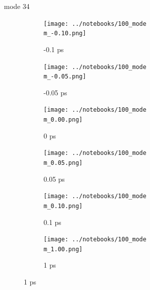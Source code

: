 \documentclass{beamer}
\begin{document}
\renewcommand\m{34}
\begin{frame}{mode \m}
	\begin{figure}
		\centering
		\begin{subfigure}[b]{\w\textwidth}
			\centering
			\texttt{[image: ../notebooks/100\_mode\\m\_-0.10.png]}
			\caption{-0.1 ps}
		\end{subfigure}
		\begin{subfigure}[b]{\w\textwidth}
			\centering
			\texttt{[image: ../notebooks/100\_mode\\m\_-0.05.png]}
			\caption{-0.05 ps}
		\end{subfigure}
		\begin{subfigure}[b]{\w\textwidth}
			\centering
			\texttt{[image: ../notebooks/100\_mode\\m\_0.00.png]}
			\caption{0 ps}
		\end{subfigure}
		\begin{subfigure}[b]{\w\textwidth}
			\centering
			\texttt{[image: ../notebooks/100\_mode\\m\_0.05.png]}
			\caption{0.05 ps}
		\end{subfigure}
		\begin{subfigure}[b]{\w\textwidth}
			\centering
			\texttt{[image: ../notebooks/100\_mode\\m\_0.10.png]}
			\caption{0.1 ps}
		\end{subfigure}
		\begin{subfigure}[b]{\w\textwidth}
			\centering
			\texttt{[image: ../notebooks/100\_mode\\m\_1.00.png]}
			\caption{1 ps}
		\end{subfigure}
	\end{figure}
\end{frame}
\end{document}

